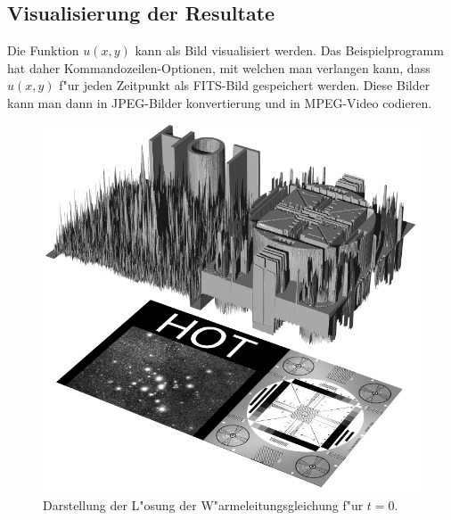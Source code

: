 \subsection{Visualisierung der Resultate}
Die Funktion $u(x,y)$ kann als Bild visualisiert werden.
Das Beispielprogramm hat daher Kommando\-zeilen-Optionen, mit welchen man
verlangen kann, dass $u(x,y)$ f"ur jeden Zeitpunkt als FITS-Bild
gespeichert werden. Diese Bilder kann man dann in JPEG-Bilder konvertierung
und in MPEG-Video codieren.
\begin{figure}
\begin{center}
\includegraphics[width=\hsize]{heat/heat-i00000.png}
\end{center}
\caption{Darstellung der L"osung der W"armeleitungsgleichung
f"ur $t=0$.
\label{heat:t0}}
\end{figure}
%
